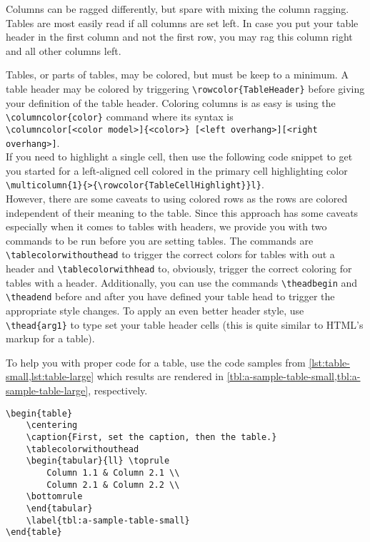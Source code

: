 Columns can be ragged differently, but spare with mixing the column ragging.
Tables are most easily read if all columns are set left.
In case you put your table header in the first column and not the first row, you may rag this column right and all other columns left.

Tables, or parts of tables, may be colored, but must be keep to a minimum.
A table header may be colored by triggering \lstinline|\rowcolor{TableHeader}| before giving your definition of the table header.
Coloring columns is as easy is using the \lstinline|\columncolor{color}| command where its syntax is\\\lstinline|\columncolor[<color model>]{<color>} [<left overhang>][<right overhang>]|.\\
If you need to highlight a single cell, then use the following code snippet to get you started for a left-aligned cell colored in the primary cell highlighting color\\ \lstinline|\multicolumn{1}{>{\rowcolor{TableCellHighlight}}l}|.\\
However, there are some caveats to using colored rows as the rows are colored independent of their meaning to the table.
Since this approach has some caveats especially when it comes to tables with headers, we provide you with two commands to be run before you are setting tables.
The commands are \lstinline|\tablecolorwithouthead| to trigger the correct colors for tables with out a header and \lstinline|\tablecolorwithhead| to, obviously, trigger the correct coloring for tables with a header.
Additionally, you can use the commands \lstinline!\theadbegin! and \lstinline!\theadend! before and after you have defined your table head to trigger the appropriate style changes.
To apply an even better header style, use \lstinline!\thead{arg1}! to type set your table header cells (this is quite similar to HTML's markup for a table).

To help you with proper code for a table, use the code samples from \cref{lst:table-small,lst:table-large} which results are rendered in \cref{tbl:a-sample-table-small,tbl:a-sample-table-large}, respectively.

\begin{lstlisting}[language={[LaTeX]TeX}, caption={Sample code for type setting small table.},label={lst:table-small}]
\begin{table}
    \centering
    \caption{First, set the caption, then the table.}
    \tablecolorwithouthead
    \begin{tabular}{ll} \toprule
        Column 1.1 & Column 2.1 \\
        Column 2.1 & Column 2.2 \\
    \bottomrule
    \end{tabular}
    \label{tbl:a-sample-table-small}
\end{table}
\end{lstlisting}


